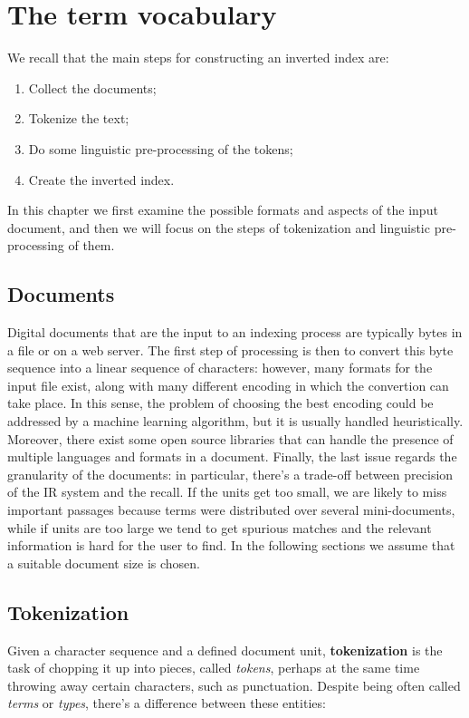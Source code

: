 \section{The term vocabulary} \label{ch3}
We recall that the main steps for constructing an inverted index are:

\begin{enumerate}
    \item Collect the documents;
    \item Tokenize the text;
    \item Do some linguistic pre-processing of the tokens;
    \item Create the inverted index.
\end{enumerate}

In this chapter we first examine the possible formats and aspects of the input document, and then we will focus on the steps of tokenization and linguistic pre-processing of them.

\subsection{Documents}
Digital documents that are the input to an indexing process are typically bytes in a file or on a web server. The first step of processing is then to convert this byte sequence into a linear sequence of characters: however, many formats for the input file exist, along with many different encoding in which the convertion can take place. In this sense, the problem of choosing the best encoding could be addressed by a machine learning algorithm, but it is usually handled heuristically. Moreover, there exist some open source libraries that can handle the presence of multiple languages and formats in a document. Finally, the last issue regards the granularity of the documents: in particular, there's a trade-off between precision of the IR system and the recall. If the units get too small, we are likely to miss important passages because terms were distributed over several mini-documents, while if units are too large we tend to get spurious matches and the relevant information is hard for the user to find. In the following sections we assume that a suitable document size is chosen.

\subsection{Tokenization}
Given a character sequence and a defined document unit, \textbf{tokenization} is the task of chopping it up into pieces, called \textit{tokens}, perhaps at the same time throwing away certain characters, such as punctuation. Despite being often called \textit{terms} or \textit{types}, there's a difference between these entities:

